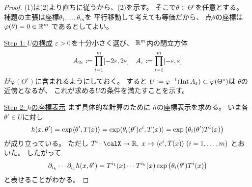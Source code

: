 \documentclass[report]{jlreq}
\begin{document}
\begin{proof}
    (1)は(2)より直ちに従うから、(2)を示す。
    そこで$\theta \in \Theta^\circ$を任意とする。
    補題の主張は座標$\theta_1, \dots, \theta_m$を
    平行移動して考えても等価だから、
    点$\theta$の座標は
    $\varphi(\theta) = 0 \in \mathbb{R}^m$
    であるとしてよい。

    \uline{Step 1: $U$の構成} \quad
    $\varepsilon > 0$を十分小さく選び、
    $\mathbb{R}^m$内の閉立方体
    \begin{alignat}{1}
        A_{2\varepsilon}
            \coloneqq
            \prod_{i = 1}^m [- 2\varepsilon, 2\varepsilon]
        \quad
        A_{\varepsilon}
            \coloneqq
            \prod_{i = 1}^m [- \varepsilon, \varepsilon]
    \end{alignat}
    が$\varphi(\Theta^\circ)$に含まれるようにしておく。
    すると
    $U \coloneqq \varphi^{-1}(\operatorname{Int} A_{\varepsilon})
        \subset \varphi(\Theta^\circ)$は
    $\theta$の近傍となるが、
    これが求める$U$の条件を満たすことを示す。

    \uline{Step 2: $h$の座標表示} \quad
    まず具体的な計算のために
    $h$の座標表示を求める。
    いま各$\theta' \in U$に対し
    \begin{equation}
        h(x, \theta')
            = \exp\langle \theta', T(x) \rangle
            = \exp\langle \theta_i(\theta') e^i, T(x) \rangle
            = \exp\left({\theta_i(\theta') T^i(x)}\right)
    \end{equation}
    が成り立っている。
    ただし
        $T^i \colon \calX \to \R, \;
        x \mapsto \langle e^i, T(x) \rangle \;
        (i = 1, \dots, m)$
    とおいた。
    したがって
    \begin{equation}
        \locallabel{eq:partial-derivative-of-h}
        \del_{i_k} \cdots \del_{i_1} h(x, \theta')
            = T^{i_1}(x) \cdots T^{i_k}(x)
                \exp\myparen{\theta_i(\theta') T^i(x)}
    \end{equation}
    と表せることがわかる。


\end{proof}
\end{document}
